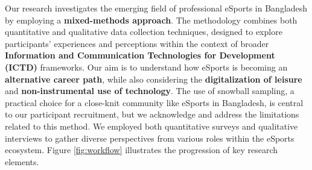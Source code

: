 \documentclass[manuscript,screen,review,anonymous]{acmart}
\begin{document}


Our research investigates the emerging field of professional eSports in Bangladesh by employing a \textbf{mixed-methods approach}. The methodology combines both quantitative and qualitative data collection techniques, designed to explore participants' experiences and perceptions within the context of broader \textbf{Information and Communication Technologies for Development (ICTD)} frameworks. Our aim is to understand how eSports is becoming an \textbf{alternative career path}, while also considering the \textbf{digitalization of leisure} and \textbf{non-instrumental use of technology}. The use of snowball sampling, a practical choice for a close-knit community like eSports in Bangladesh, is central to our participant recruitment, but we acknowledge and address the limitations related to this method. We employed both quantitative surveys and qualitative interviews to gather diverse perspectives from various roles within the eSports ecosystem. Figure \ref{fig:workflow} illustrates the progression of key research elements.
\end{document}

